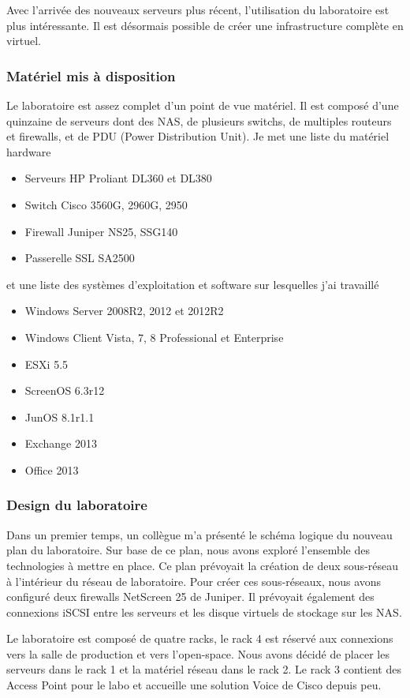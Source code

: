 Avec l'arrivée des nouveaux serveurs plus récent, l'utilisation du laboratoire est plus intéressante.
Il est désormais possible de créer une infrastructure complète en virtuel.

\subsubsection{Matériel mis à disposition}
Le laboratoire est assez complet d'un point de vue matériel. 
Il est composé d'une quinzaine de serveurs dont des NAS, de plusieurs switchs, de multiples routeurs et firewalls, et de PDU (Power Distribution Unit).
Je met une liste du matériel hardware
\begin{itemize}
	\item Serveurs HP Proliant DL360 et DL380
	\item Switch Cisco 3560G, 2960G, 2950
	\item Firewall Juniper NS25, SSG140
	\item Passerelle SSL SA2500
\end{itemize}
et une liste des systèmes d'exploitation et software sur lesquelles j'ai travaillé
\begin{itemize}
	\item Windows Server 2008R2, 2012 et 2012R2
	\item Windows Client Vista, 7, 8 Professional et Enterprise
	\item ESXi 5.5
	\item ScreenOS 6.3r12
	\item JunOS 8.1r1.1
	\item Exchange 2013
	\item Office 2013
\end{itemize}

\subsubsection{Design du laboratoire}
Dans un premier temps, un collègue m'a présenté le schéma logique du nouveau plan du laboratoire.
Sur base de ce plan, nous avons exploré l'ensemble des technologies à mettre en place.
Ce plan prévoyait la création de deux sous-réseau à l'intérieur du réseau de laboratoire.
Pour créer ces sous-réseaux, nous avons configuré deux firewalls NetScreen 25 de Juniper. 
Il prévoyait également des connexions iSCSI entre les serveurs et les disque virtuels de stockage sur les NAS.

Le laboratoire est composé de quatre racks, le rack 4 est réservé aux connexions vers la salle de production et vers l'open-space.
Nous avons décidé de placer les serveurs dans le rack 1 et la matériel réseau dans le rack 2.
Le rack 3 contient des Access Point pour le labo et accueille une solution Voice de Cisco depuis peu.

